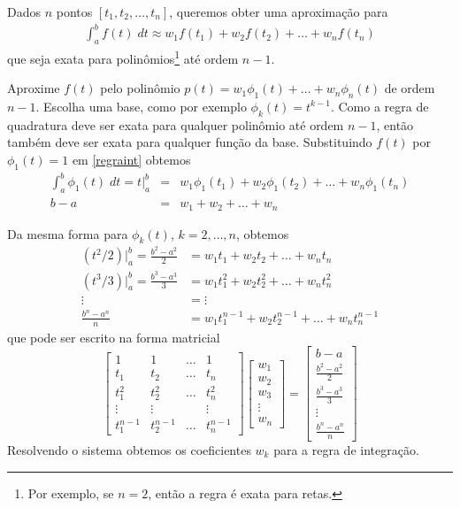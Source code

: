Dados $n$ pontos $[t_1,t_2,\ldots ,t_n]$, queremos obter uma aproximação para
\begin{align}\label{regraint}
  \int _a^b f(t) \;dt \approx w_1f(t_1)+w_2f(t_2)+\ldots +w_nf(t_n)
\end{align}
que seja exata para polinômios\footnote{Por exemplo, se $n=2$, então a regra é exata para retas.} até ordem  $n-1$.

Aproxime $f(t)$ pelo polinômio $p(t)=w_1\phi_1(t)+\ldots +w_n \phi_n(t)$ de ordem $n-1$. Escolha uma base, como por exemplo $\phi _k(t)=t^{k-1}$. Como a regra de quadratura deve ser exata para qualquer polinômio até ordem $n-1$, então também deve ser exata para qualquer função da base. Substituindo $f(t)$ por $\phi _1(t)=1$ em \eqref{regraint} obtemos 
\begin{eqnarray}
\int _a^b \phi_1(t) \; dt = t|_a^b &=&  w_1\phi _1(t_1)+w_2\phi _1(t_2)+\ldots +w_n\phi_1(t_n) \\
                              b-a  &=&  w_1+w_2+\ldots +w_n
\end{eqnarray}

Da mesma forma para $\phi_k(t)$, $k=2,\ldots,n$, obtemos
\begin{align}
   (t^2/2)|_a^b = \frac{b^2-a^2}{2} &=  w_1t_1  +w_2t_2  +\ldots +w_nt_n   \\
   (t^3/3)|_a^b = \frac{b^3-a^3}{3} &=  w_1t_1^2+w_2t_2^2+\ldots +w_nt_n^2 \\
                    \vdots          &=  \vdots    \\
 \frac{b^{n}-a^{n}}{n}              &=  w_1t_1^{n-1}+w_2t_2^{n-1}+\ldots +w_nt_n^{n-1}
\end{align}
que pode ser escrito na forma matricial
\begin{equation}
\begin{bmatrix}
    1     &  1    & \ldots   &  1 \\
    t_1   &  t_2   & \ldots   & t_n \\
    t_1^2 &  t_2^2  & \ldots   & t_n^2 \\
    \vdots    &  \vdots     &    & \vdots   \\
    t_1^{n-1} & t_2^{n-1} & \ldots   & t_n^{n-1}
\end{bmatrix}
\begin{bmatrix}  w_1 \\ w_2\\ w_3  \\ \vdots   \\ w_n     \end{bmatrix}
=
\begin{bmatrix}  b-a  \\ \frac{b^2-a^2}{2} \\ \frac{b^3-a^3}{3} \\ \vdots  \\ \frac{b^{n}-a^{n}}{n}  \end{bmatrix}
\end{equation}
Resolvendo o sistema obtemos os coeficientes $w_k$ para a regra de integração.

